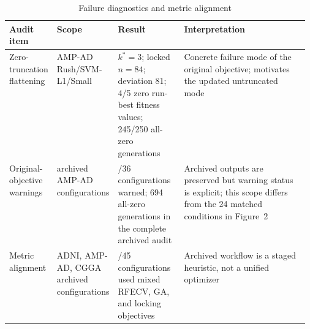 \begin{table}[tbp]
\centering
\caption{Failure diagnostics and metric alignment}
\label{tab:main3}
\footnotesize
\renewcommand{\arraystretch}{1.10}
\setlength{\tabcolsep}{3pt}
\begin{tabularx}{\linewidth}{@{}>{\raggedright\arraybackslash}p{0.15\linewidth}>{\raggedright\arraybackslash}p{0.20\linewidth}>{\raggedright\arraybackslash}p{0.22\linewidth}>{\raggedright\arraybackslash}X@{}}
\toprule
\bfseries Audit item & \bfseries Scope & \bfseries Result & \bfseries Interpretation \\
\midrule
Zero-truncation flattening & AMP-AD Rush/SVM-L1/Small & $k^*=3$; locked $n=84$; deviation 81; 4/5 zero run-best fitness values; 245/250 all-zero generations & Concrete failure mode of the original objective; motivates the updated untruncated mode \\
Original-objective warnings & 36 archived AMP-AD configurations & 18/36 configurations warned; 694 all-zero generations in the complete archived audit & Archived outputs are preserved but warning status is explicit; this scope differs from the 24 matched conditions in Figure~2 \\
Metric alignment & ADNI, AMP-AD, CGGA archived configurations & 45/45 configurations used mixed RFECV, GA, and locking objectives & Archived workflow is a staged heuristic, not a unified optimizer \\
\bottomrule
\end{tabularx}
\end{table}
